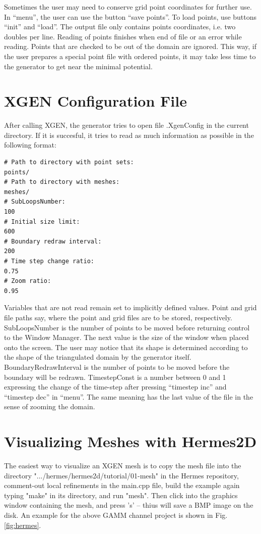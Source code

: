 \documentclass[12pt]{article}
\begin{document}
  Sometimes the user may need to conserve grid point coordinates for
  further use. In ``menu'', the user can use the button ``save points''.
  To load points, use buttons ``init'' and ``load''.
  \indent
  The output file only contains points coordinates, i.e. two
  doubles per line. Reading of points finishes when end of file
  or an error while reading. Points that are checked to be
  out of the domain are ignored. This way, if the user prepares a 
  special point file with ordered points, it may take less
  time to the generator to get near the minimal potential.  

  \section{XGEN Configuration File}
   
  After calling XGEN, the generator tries to open file
  .XgenConfig in the current directory. If it is succesful,
  it tries to read as much information as possible in the
  following format:

  \begin{verbatim} 
# Path to directory with point sets:
points/
# Path to directory with meshes:
meshes/
# SubLoopsNumber:
100
# Initial size limit:
600
# Boundary redraw interval:
200
# Time step change ratio:
0.75
# Zoom ratio:
0.95
  \end{verbatim}
  Variables that are not read remain set to implicitly defined
  values. Point and grid file paths say, where the point and grid 
  files are to be stored, respectively. SubLoopsNumber is the number of
  points to be moved before returning control to the Window Manager.
  The next value is the size of the window when placed onto the screen.
  The user may notice that its shape is determined according to the shape
  of the triangulated domain by the generator itself. BoundaryRedrawInterval
  is the number of points to be moved before the boundary will be
  redrawn. TimestepConst is a number between 0 and 1 expressing the change of
  the time-step after pressing ``timestep inc'' and ``timestep dec'' in ``menu''.
  The same meaning has the last value of the file in the sense of
  zooming the domain.

  \section{Visualizing Meshes with Hermes2D}

  The easiest way to visualize an XGEN mesh is to copy the mesh file into 
  the directory ".../hermes/hermes2d/tutorial/01-mesh" in the Hermes repository, 
  comment-out local refinements
  in the main.cpp file, build the example again typing "make" in its directory, and 
  run "mesh". Then click into the graphics window containing the mesh, and press 's'
  -- thius will save a BMP image on the disk. An example for the above GAMM channel
  project is shown in Fig. \ref{fig:hermes}.
\end{document}
